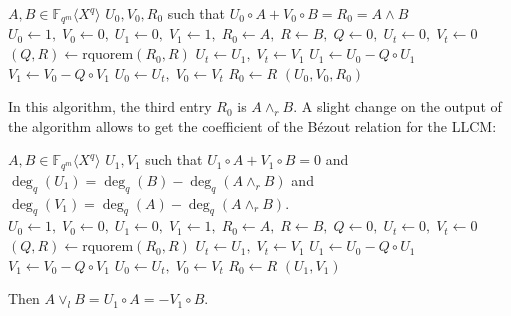 \documentclass{article}
\theoremstyle{definition}
\begin{document}
\begin{algorithm}
      \caption{Extended right Euclidean algorithm for $q$-degree polynomials (RGCD)}
      \begin{algorithmic}[1]
            \REQUIRE $A, B \in \mathbb{F}_{q^m} \langle X^q \rangle$
            \ENSURE $U_0, V_0, R_0$ such that $U_0 \circ A + V_0 \circ B = R_0 = A \wedge B$
            \STATE $U_0 \gets 1,\; V_0 \gets 0,\; U_1 \gets 0,\; V_1 \gets 1,\; R_0 \gets A,\; R \gets B,\; Q \gets 0,\; U_t \gets 0,\; V_t \gets 0$
            \STATE $(Q, R) \gets \text{rquorem}(R_0, R)$
            \STATE $U_t \gets U_1,\; V_t \gets V_1$
            \STATE $U_1 \gets U_0 - Q \circ U_1$
            \STATE $V_1 \gets V_0 - Q \circ V_1$
            \STATE $U_0 \gets U_t,\; V_0 \gets V_t$
            \STATE $R_0 \gets R$
            \ENDWHILE
            \RETURN $(U_0, V_0, R_0)$
      \end{algorithmic}
\end{algorithm}

\noindent In this algorithm, the third entry $R_0$ is $A \wedge_r B$. A slight change
on the output of the algorithm allows to get the coefficient of the B{\'e}zout
relation for the LLCM:

\begin{algorithm}[H]
      \caption{Algorithm for computing left co-multipliers (LLCM)}
      \begin{algorithmic}[1]
            \REQUIRE $A, B \in \mathbb{F}_{q^m} \langle X^q \rangle$
            \ENSURE $U_1, V_1$ such that $U_1 \circ A + V_1 \circ B = 0$ and
            $\deg_q(U_1) = \deg_q(B) - \deg_q(A \wedge_r B)$ and
            $\deg_q(V_1) = \deg_q(A) - \deg_q(A \wedge_r B)$.
            \STATE $U_0 \gets 1,\; V_0 \gets 0,\; U_1 \gets 0,\; V_1 \gets 1,\; R_0 \gets A,\; R \gets B,\; Q \gets 0,\; U_t \gets 0,\; V_t \gets 0$
            \STATE $(Q, R) \gets \text{rquorem}(R_0, R)$
            \STATE $U_t \gets U_1,\; V_t \gets V_1$
            \STATE $U_1 \gets U_0 - Q \circ U_1$
            \STATE $V_1 \gets V_0 - Q \circ V_1$
            \STATE $U_0 \gets U_t,\; V_0 \gets V_t$
            \STATE $R_0 \gets R$
            \ENDWHILE
            \RETURN $(U_1, V_1)$
      \end{algorithmic}
\end{algorithm}



Then $A \vee_l B = U_1 \circ A = -V_1 \circ B$.\\
\end{document}
